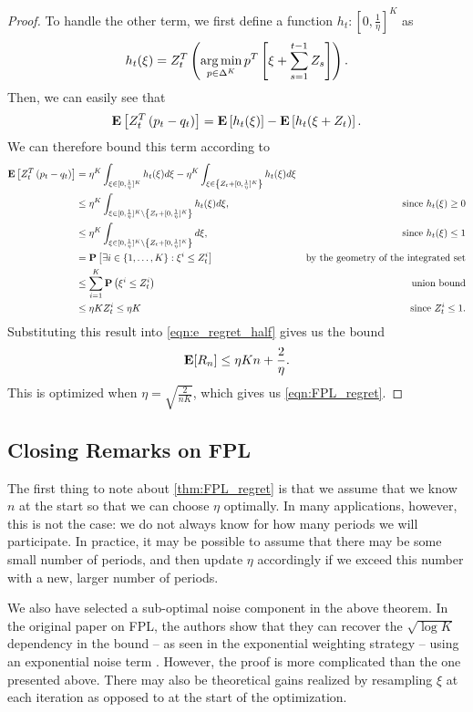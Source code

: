 \begin{theorem}
\begin{proof}
To handle the other term, we first define a function $h_t : [0, \frac{1}{\eta}]^K$ as 
\[
h_t(\xi) = Z_t^T \left(\operatorname*{arg\,min}_{p \in \Delta^K} p^T \left[\xi + \sum_{s=1}^{t-1} Z_s \right] \right).
\]
Then, we can easily see that 
\[
\mathbf{E}\left[Z_t^T \left(p_t - q_t\right) \right] = \mathbf{E}\left[h_t(\xi)\right] -  \mathbf{E}\left[h_t(\xi + Z_t)\right].
\]
We can therefore bound this term according to
\begin{align*}
\mathbf{E}\left[Z_t^T \left(p_t - q_t\right) \right] &= \eta^K \int_{\xi \in [0, \frac{1}{\eta}]^K} h_t(\xi)d\xi - \eta^K \int_{\xi \in \left\{Z_t + [0, \frac{1}{\eta}]^K\right\}} h_t(\xi)d\xi \\
&\leq \eta^K \int_{\xi \in [0, \frac{1}{\eta}]^K \setminus \left\{Z_t + [0, \frac{1}{\eta}]^K\right\}} h_t(\xi)d\xi, &\text{since $h_t(\xi) \geq 0$} \\
&\leq \eta^K \int_{\xi \in [0, \frac{1}{\eta}]^K \setminus \left\{Z_t + [0, \frac{1}{\eta}]^K\right\}} d\xi, &\text{since $h_t(\xi) \leq 1$} \\
&= \mathbf{P}\left[\exists i \in \{1, \ldots, K\} : \xi^i \leq Z_t^i\right] &\text{by the geometry of the integrated set}\\
&\leq \sum_{i=1}^K \mathbf{P}\left(\xi^i \leq Z_t^i\right) &\text{union bound} \\
&\leq \eta K Z_t^i \leq \eta K &\text{since $Z_t^i \leq 1$}.
\end{align*}
Substituting this result into \eqref{eqn:e_regret_half} gives us the bound 
\[
\mathbf{E}[R_n] \leq \eta K n + \frac{2}{\eta}.
\]
This is optimized when $\eta = \sqrt{\frac{2}{nK}}$, which gives us \eqref{eqn:FPL_regret}. 
\end{proof}
\end{theorem}

\subsection{Closing Remarks on FPL}
The first thing to note about \autoref{thm:FPL_regret} is that we assume that we know $n$ at the start so that we can choose $\eta$ optimally. In many applications, however, this is not the case: we do not always know for how many periods we will participate. In practice, it may be possible to assume that there may be some small number of periods, and then update $\eta$ accordingly if we exceed this number with a new, larger number of periods. 

We also have selected a sub-optimal noise component in the above theorem. In the original paper on FPL, the authors show that they can recover the $\sqrt{\log K}$ dependency in the bound -- as seen in the exponential weighting strategy -- using an exponential noise term \cite{kalai2005efficient}. However, the proof is more complicated than the one presented above. There may also be theoretical gains realized by resampling $\xi$ at each iteration as opposed to at the start of the optimization. 

